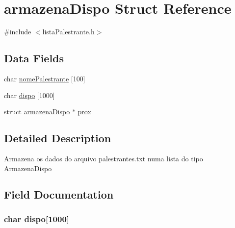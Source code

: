 \hypertarget{structarmazena_dispo}{}\section{armazena\+Dispo Struct Reference}
\label{structarmazena_dispo}


{\ttfamily \#include $<$lista\+Palestrante.\+h$>$}

\subsection*{Data Fields}
\begin{DoxyCompactItemize}
\item 
char \hyperlink{structarmazena_dispo_af31dd10e6cbda382c5fcb72a1d7e34ff}{nome\+Palestrante} \mbox{[}100\mbox{]}
\item 
char \hyperlink{structarmazena_dispo_a0dce433794a7408c33fda01d8f3757b3}{dispo} \mbox{[}1000\mbox{]}
\item 
struct \hyperlink{structarmazena_dispo}{armazena\+Dispo} $\ast$ \hyperlink{structarmazena_dispo_a554d0729e872d59403b779eb4fe5ad83}{prox}
\end{DoxyCompactItemize}


\subsection{Detailed Description}
Armazena os dados do arquivo \textquotesingle{}palestrantes.\+txt\textquotesingle{} numa lista do tipo \textquotesingle{}Armazena\+Dispo\textquotesingle{} 

\subsection{Field Documentation}
\hypertarget{structarmazena_dispo_a0dce433794a7408c33fda01d8f3757b3}{}
\subsubsection[{dispo}]{\setlength{\rightskip}{0pt plus 5cm}char dispo\mbox{[}1000\mbox{]}}\label{structarmazena_dispo_a0dce433794a7408c33fda01d8f3757b3}
\hypertarget{structarmazena_dispo_af31dd10e6cbda382c5fcb72a1d7e34ff}{}
